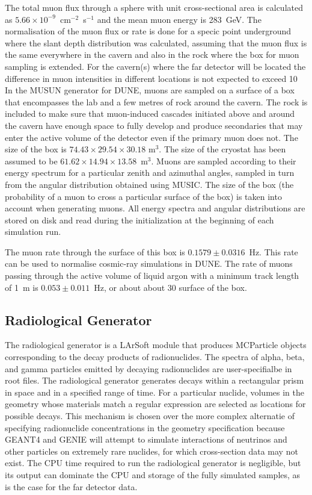 The total muon flux through a sphere with unit cross-sectional area is calculated as $5.66\times
10^{-9}$~cm$^{-2}$~s$^{-1}$ and the mean muon energy is 283~GeV.
The normalisation of the muon flux or rate is done for a specic point underground where
the slant depth distribution was calculated, assuming that the muon flux is the same 
everywhere in the cavern and also in the
rock where the box for muon sampling is extended. For the cavern(s) where the far
detector will be located the difference in muon intensities in different locations is not
expected to exceed 10%
In the MUSUN generator for DUNE, muons are sampled on a surface of a box that
encompasses the lab and a few metres of rock around the cavern. The rock is 
included to make sure that muon-induced cascades initiated above and around the cavern
have enough space to fully develop and produce secondaries that may enter the active volume
of the detector even if the primary muon does not.
The size of the box is $74.43\times29.54\times30.18$ m$^{3}$. The size of
the cryostat has been assumed to be $61.62\times14.94\times13.58$~m$^{3}$.
Muons are sampled according to their energy spectrum for a particular zenith and 
azimuthal angles, sampled in turn from the angular distribution obtained using MUSIC. 
The size of the box (the probability of a muon to cross a particular
surface of the box) is taken into account when generating muons. All energy spectra 
and angular distributions are stored on disk and read during the initialization at
the beginning of each simulation run. 

The muon rate through the surface of this box is $0.1579\pm 0.0316$~Hz. This rate can be used
to normalise cosmic-ray simulations in DUNE. The rate of muons passing through
the active volume of liquid argon with a minimum track length of 1~m 
is $0.053\pm 0.011$~Hz, or about about 30%
surface of the box.


\subsection{Radiological Generator}

The radiological generator is a LArSoft module that produces MCParticle objects corresponding
to the decay products of radionuclides.  The spectra of alpha, beta, and gamma particles emitted
by decaying radionuclides are user-specifialbe in root files.  The radiological generator generates
decays within a rectangular prism in space and in a specified range of time.  For a particular
nuclide, volumes in the geometry whose materials match a regular expression are selected as locations
for possible decays.  This mechanism is chosen over the more complex alternatie of specifying radionuclide
concentrations in the geometry specification because GEANT4 and GENIE will attempt to simulate interactions
of neutrinos and other particles on extremely rare nuclides, for which cross-section data may not exist.
The CPU time required to run the radiological generator is negligible, but its output can dominate
the CPU and storage of the fully simulated samples, as is the case for the far detector data.


